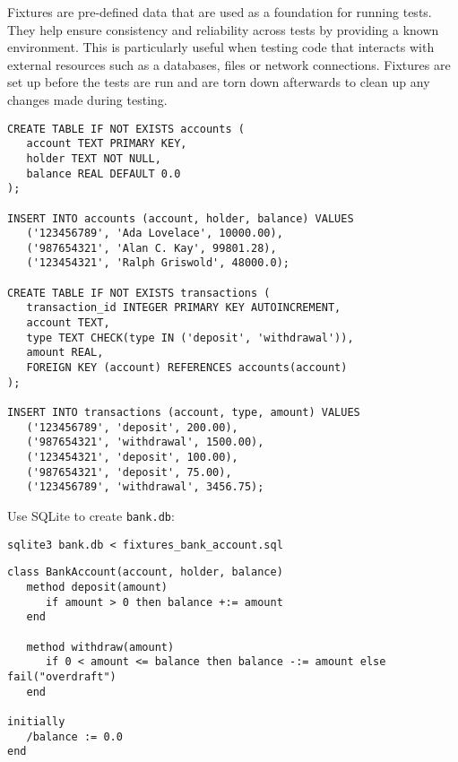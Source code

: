 \documentclass[letterpaper,12pt]{article}
\begin{document}
Fixtures are pre-defined data that are used as a foundation for running tests. They help ensure consistency and reliability across tests by providing a known environment. This is particularly useful when testing code that interacts with external resources such as a databases, files or network connections. Fixtures are set up before the tests are run and are torn down afterwards to clean up any changes made during testing.

\bigskip{}
\begin{verbatim}
CREATE TABLE IF NOT EXISTS accounts (
   account TEXT PRIMARY KEY,
   holder TEXT NOT NULL,
   balance REAL DEFAULT 0.0
);

INSERT INTO accounts (account, holder, balance) VALUES
   ('123456789', 'Ada Lovelace', 10000.00),
   ('987654321', 'Alan C. Kay', 99801.28),
   ('123454321', 'Ralph Griswold', 48000.0);

CREATE TABLE IF NOT EXISTS transactions (
   transaction_id INTEGER PRIMARY KEY AUTOINCREMENT,
   account TEXT,
   type TEXT CHECK(type IN ('deposit', 'withdrawal')),
   amount REAL,
   FOREIGN KEY (account) REFERENCES accounts(account)
);

INSERT INTO transactions (account, type, amount) VALUES
   ('123456789', 'deposit', 200.00),
   ('987654321', 'withdrawal', 1500.00),
   ('123454321', 'deposit', 100.00),
   ('987654321', 'deposit', 75.00),
   ('123456789', 'withdrawal', 3456.75);
\end{verbatim}

\noindent Use SQLite to create \texttt{bank.db}:
\begin{verbatim}
sqlite3 bank.db < fixtures_bank_account.sql
\end{verbatim}

\newpage\bigskip{}
\begin{verbatim}
class BankAccount(account, holder, balance)
   method deposit(amount)
      if amount > 0 then balance +:= amount
   end

   method withdraw(amount)
      if 0 < amount <= balance then balance -:= amount else fail("overdraft")
   end

initially
   /balance := 0.0
end
\end{verbatim}
\end{document}
